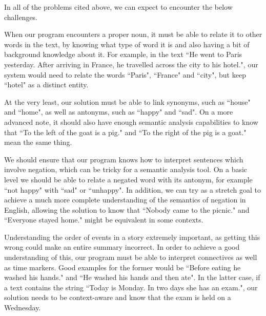 In all of the problems cited above, we can expect to encounter the below challenges.

\begin{challenge}
When our program encounters a proper noun, it must be able to relate it to other words in the text, by knowing what type of word it is and also having a bit of background knowledge about it. For example, in the text ``He went to Paris yesterday. After arriving in France, he travelled across the city to his hotel.", our system would need to relate the words ``Paris", ``France" and ``city", but keep ``hotel" as a distinct entity.
\end{challenge}

\begin{challenge}[Periphrasis]
At the very least, our solution must be able to link synonyms, such as ``house" and ``home", as well as antonyms, such as ``happy" and ``sad". On a more advanced note, it should also have enough semantic analysis capabilities to know that ``To the left of the goat is a pig." and ``To the right of the pig is a goat." mean the same thing.
\end{challenge}

\begin{challenge}[Negation]
We should ensure that our program knows how to interpret sentences which involve negation, which can be tricky for a semantic analysis tool. On a basic level we should be able to relate a negated word with its antonym, for example ``not happy" with ``sad" or ``unhappy". In addition, we can try as a stretch goal to achieve a much more complete understanding of the semantics of negation in English, allowing the solution to know that ``Nobody came to the picnic." and ``Everyone stayed home." might be equivalent in some contexts.
\end{challenge}

\begin{challenge}
Understanding the order of events in a story extremely important, as getting this wrong could make an entire summary incorrect. In order to achieve a good understanding of this, our program must be able to interpret connectives as well as time markers. Good examples for the former would be ``Before eating he washed his hands." and ``He washed his hands and then ate". In the latter case, if a text contains the string ``Today is Monday. In two days she has an exam.", our solution needs to be context-aware and know that the exam is held on a Wednesday.
\end{challenge}

